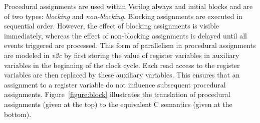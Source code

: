 %
%
Procedural assignments are used within Verilog always and initial blocks and
are of two types: \emph{blocking} and \emph{non-blocking}.  Blocking
assignments are executed in sequential order.  However, the effect of
blocking assignments is visible immediately, whereas the effect of
non-blocking assignments is delayed until all events triggered are
processed.  This form of parallelism in procedural assignments are modeled
in \emph{v2c} by first storing the value of register variables in auxiliary
variables in the beginning of the clock cycle.  Each read access to the
register variables are then replaced by these auxiliary variables.  This
ensures that an assignment to a register variable do not influence
subsequent procedural assignments.  Figure~\ref{figure:block} illustrates
the translation of procedural assignments (given at the top) to the
equivalent C semantics (given at the bottom).
%
